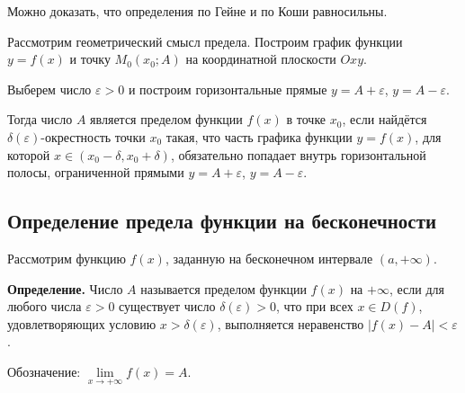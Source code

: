 \documentclass[a4paper,11pt]{article}
\begin{document}
Можно доказать, что определения по Гейне и по Коши равносильны.

Рассмотрим геометрический смысл предела. Построим график функции $y = f(x)$ и точку
$M_0(x_0; A)$ на координатной плоскости $Oxy$.

Выберем число $\varepsilon > 0$ и построим горизонтальные прямые
$y = A + \varepsilon$, $y = A - \varepsilon$.

Тогда число $A$ является пределом функции $f(x)$ в точке $x_0$, если найдётся
$\delta(\varepsilon)$-окрестность точки $x_0$ такая, что часть графика функции $y = f(x)$,
для которой $x \in (x_0 - \delta, x_0 + \delta)$, обязательно попадает внутрь
горизонтальной полосы, ограниченной прямыми $y = A + \varepsilon$, $y = A - \varepsilon$.

\begin{center}
\end{center}

\subsection{Определение предела функции на бесконечности}

Рассмотрим функцию $f(x)$, заданную на бесконечном интервале $(a, +\infty)$.

\begin{opr}
\textbf{Определение.}
  Число $A$ называется пределом функции $f(x)$ на $+\infty$, если для любого числа
  $\varepsilon > 0$ существует число $\delta(\varepsilon) > 0$, что при всех $x \in D(f)$,
  удовлетворяющих условию $x > \delta(\varepsilon)$, выполняется неравенство
  $|f(x) - A| < \varepsilon$.

  Обозначение: $\lim\limits_{x \to +\infty} f(x) = A$.
\end{opr}
\end{document}
